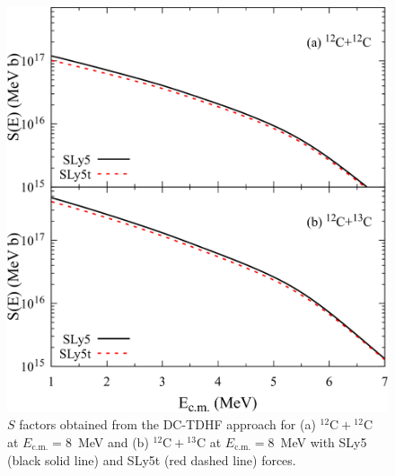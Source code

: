 \begin{figure}
\includegraphics[width=\textwidth]{../Figures/TensorXsec/SFactors_CC.pdf}
\caption{$S$ factors obtained from the DC-TDHF approach for (a) $^{12}\mathrm{C}+\mathrm{^{12}C}$ at $E_{\mathrm{c.m.}}=8$~MeV and (b) $^{12}\mathrm{C}+\mathrm{^{13}C}$ at $E_{\mathrm{c.m.}}=8$~MeV with SLy5 (black solid line) and SLy5t (red dashed line) forces.
	\label{Fig:CCsfac}}
\end{figure}

